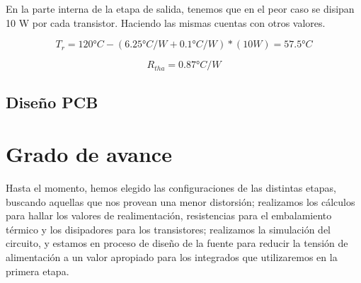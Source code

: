 \documentclass[a4paper,12pt,twoside]{article}
\begin{document}
En la  parte interna de la etapa de salida, tenemos que en el peor caso se disipan 10 W por cada transistor.
Haciendo las mismas cuentas con otros valores.


\begin{equation*}
T_r = 120°C - (6.25°C/W + 0.1°C/W)*(10W) = 57.5 °C
\end{equation*}

\begin{equation*}
R_{tha} = 0.87 °C/W
\end{equation*}



















\subsection{Diseño PCB}


\section{Grado de avance}

Hasta el momento, hemos elegido las configuraciones de las distintas etapas, buscando aquellas que nos provean una menor distorsión; realizamos los cálculos para hallar los valores de realimentación, resistencias para el embalamiento térmico y los disipadores para los transistores; realizamos la simulación del circuito, y estamos en proceso de diseño de la fuente para reducir la tensión de alimentación a un valor apropiado para los integrados que utilizaremos en la primera etapa. 
\end{document}
